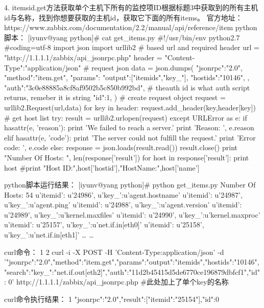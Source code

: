 4.     itemsid.get方法获取单个主机下所有的监控项ID根据标题3中获取到的所有主机id与名称，找到你想要获取的主机id，获取它下面的所有items。
官方地址：https://www.zabbix.com/documentation/2.2/manual/api/reference/item
python脚本：
[iyunv@yang python]# cat get_items.py
#!/usr/bin/env python2.7
#coding=utf-8
import json
import urllib2
# based url and required header
url = "http://1.1.1.1/zabbix/api_jsonrpc.php"
header = {"Content-Type":"application/json"}
# request json
data = json.dumps(
{
   "jsonrpc":"2.0",
   "method":"item.get",
   "params":{
       "output":["itemids","key_"],
       "hostids":"10146",
   },
   "auth":"3c0e88885a8cf8af9502b5c850b992bd", # theauth id is what auth script returns, remeber it is string
   "id":1,
})
# create request object
request = urllib2.Request(url,data)
for key in header:
   request.add_header(key,header[key])
# get host list
try:
   result = urllib2.urlopen(request)
except URLError as e:
   if hasattr(e, 'reason'):
       print 'We failed to reach a server.'
       print 'Reason: ', e.reason
   elif hasattr(e, 'code'):
       print 'The server could not fulfill the request.'
       print 'Error code: ', e.code
else:
   response = json.loads(result.read())
   result.close()
   print "Number Of Hosts: ", len(response['result'])
   for host in response['result']:
       print host
       #print "Host ID:",host['hostid'],"HostName:",host['name']



python脚本运行结果：
[iyunv@yang python]# python get_items.py
Number Of Hosts:  54
{u'itemid': u'24986', u'key_':u'agent.hostname'}
{u'itemid': u'24987', u'key_':u'agent.ping'}
{u'itemid': u'24988', u'key_':u'agent.version'}
{u'itemid': u'24989', u'key_':u'kernel.maxfiles'}
{u'itemid': u'24990', u'key_':u'kernel.maxproc'}
{u'itemid': u'25157', u'key_':u'net.if.in[eth0]'}
{u'itemid': u'25158', u'key_':u'net.if.in[eth1]'}
… …



curl命令：
1
2
curl -i -X POST -H 'Content-Type:application/json' -d '{"jsonrpc":"2.0","method":"item.get","params":{"output":"itemids","hostids":"10146","search":{"key_":"net.if.out[eth2]"}},"auth":"11d2b45415d5de6770ce196879dbfcf1","id": 0}' http://1.1.1.1/zabbix/api_jsonrpc.php
#此处加上了单个key的名称



curl命令执行结果：
1
{"jsonrpc":"2.0","result":[{"itemid":"25154"}],"id":0}



